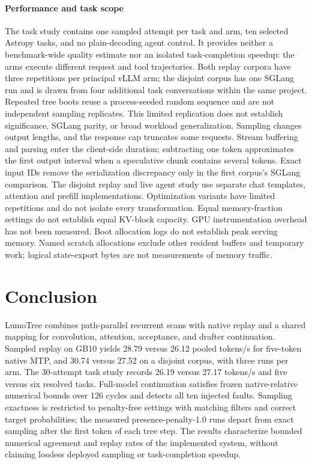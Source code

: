 \documentclass[conference]{IEEEtran}
\newcommand{\sys}{LumoTree}
\begin{document}
\paragraph{Performance and task scope}
The task study contains one sampled attempt per task and arm, ten selected Astropy tasks, and no plain-decoding agent control. It provides neither a benchmark-wide quality estimate nor an isolated task-completion speedup: the arms execute different request and tool trajectories. Both replay corpora have three repetitions per principal vLLM arm; the disjoint corpus has one SGLang run and is drawn from four additional task conversations within the same project. Repeated tree boots reuse a process-seeded random sequence and are not independent sampling replicates. This limited replication does not establish significance, SGLang parity, or broad workload generalization. Sampling changes output lengths, and the response cap truncates some requests. Stream buffering and parsing enter the client-side duration; subtracting one token approximates the first output interval when a speculative chunk contains several tokens. Exact input IDs remove the serialization discrepancy only in the first corpus's SGLang comparison. The disjoint replay and live agent study use separate chat templates, attention and prefill implementations. Optimization variants have limited repetitions and do not isolate every transformation. Equal memory-fraction settings do not establish equal KV-block capacity. GPU instrumentation overhead has not been measured. Boot allocation logs do not establish peak serving memory. Named scratch allocations exclude other resident buffers and temporary work; logical state-export bytes are not measurements of memory traffic.

\section{Conclusion}
\sys{} combines path-parallel recurrent scans with native replay and a shared mapping for convolution, attention, acceptance, and drafter continuation. Sampled replay on GB10 yields 28.79 versus 26.12 pooled tokens/s for five-token native MTP, and 30.74 versus 27.52 on a disjoint corpus, with three runs per arm. The 30-attempt task study records 26.19 versus 27.17 tokens/s and five versus six resolved tasks. Full-model continuation satisfies frozen native-relative numerical bounds over 126 cycles and detects all ten injected faults. Sampling exactness is restricted to penalty-free settings with matching filters and correct target probabilities; the measured presence-penalty-1.0 runs depart from exact sampling after the first token of each tree step. The results characterize bounded numerical agreement and replay rates of the implemented system, without claiming lossless deployed sampling or task-completion speedup.
\end{document}
